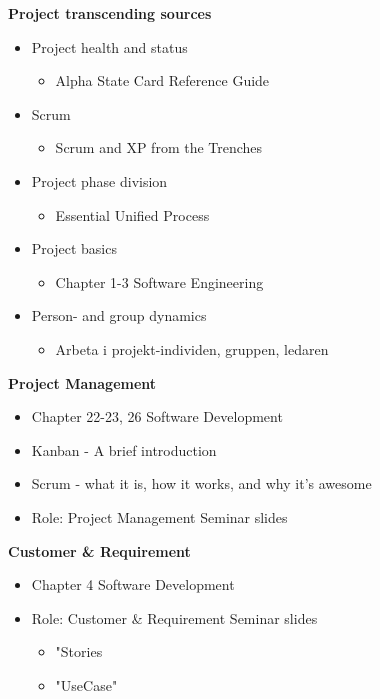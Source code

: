 \textbf{Project transcending sources}
\begin{itemize}
    \item Project health and status
        \begin{itemize}
            \item Alpha State Card Reference Guide \cite{noauthor_alpha_2015} 
        \end{itemize}
    \item Scrum
        \begin{itemize}
            \item Scrum and XP from the Trenches\cite{kniberg_scrum_2015}
        \end{itemize}
    \item Project phase division
        \begin{itemize}
            \item Essential Unified Process \cite{noauthor_essential_2016}
        \end{itemize}
    \item Project basics
        \begin{itemize}
            \item Chapter 1-3 Software Engineering \cite{ian_sommerville_software_nodate}
        \end{itemize}
    \item Person- and group dynamics
        \begin{itemize}
            \item Arbeta i projekt-individen, gruppen, ledaren \cite{eklund_arbeta_2010}
        \end{itemize}
\end{itemize}

\vspace{5mm} %

\textbf{Project Management}
\begin{itemize}
    \item Chapter 22-23, 26 Software Development \cite{ian_sommerville_software_nodate} 
    \item Kanban - A brief introduction \cite{atlassian_kanban_nodate}
    \item Scrum - what it is, how it works, and why it's awesome \cite{atlassian_scrum_nodate}
    \item Role: Project Management Seminar slides \cite{lundevall_rollen_nodate}
\end{itemize}

\textbf{Customer \& Requirement}
\begin{itemize}
    \item Chapter 4 Software Development \cite{ian_sommerville_software_nodate}
    \item Role: Customer \& Requirement Seminar slides
    \begin{itemize}
        \item "Stories
        \item "UseCase"
    \end{itemize}
\end{itemize}

